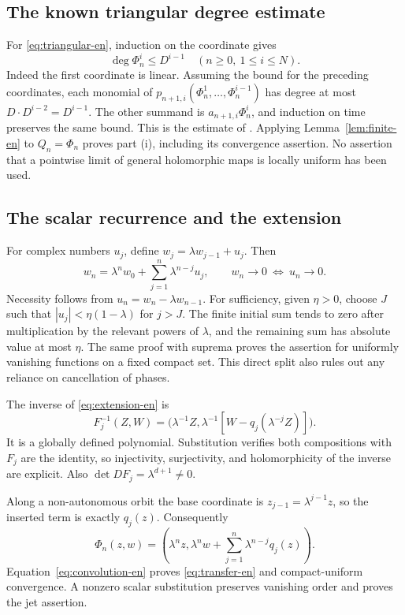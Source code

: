 \documentclass[12pt]{amsart}
\theoremstyle{definition}
\theoremstyle{remark}
\numberwithin{equation}{section}
\begin{document}
\subsection{The known triangular degree estimate}
For \eqref{eq:triangular-en}, induction on the coordinate gives
\begin{equation}\label{eq:degree-en}
\deg\Phi_n^i\leq D^{i-1}\quad(n\geq0,\ 1\leq i\leq N).
\end{equation}
Indeed the first coordinate is linear. Assuming the bound for the preceding coordinates, each monomial of $p_{n+1,i}(\Phi_n^1,\ldots,\Phi_n^{i-1})$ has degree at most $D\cdot D^{i-2}=D^{i-1}$. The other summand is $a_{n+1,i}\Phi_n^i$, and induction on time preserves the same bound. This is the estimate of \cite[Lemma 1]{AS-en}. Applying Lemma~\ref{lem:finite-en} to $Q_n=\Phi_n$ proves part (i), including its convergence assertion. No assertion that a pointwise limit of general holomorphic maps is locally uniform has been used.

\subsection{The scalar recurrence and the extension}
For complex numbers $u_j$, define $w_j=\lambda w_{j-1}+u_j$. Then
\begin{equation}\label{eq:convolution-en}
w_n=\lambda^nw_0+\sum_{j=1}^n\lambda^{n-j}u_j,
\qquad
w_n\to0\ \Longleftrightarrow\ u_n\to0.
\end{equation}
Necessity follows from $u_n=w_n-\lambda w_{n-1}$. For sufficiency, given $\eta>0$, choose $J$ such that $|u_j|<\eta(1-\lambda)$ for $j>J$. The finite initial sum tends to zero after multiplication by the relevant powers of $\lambda$, and the remaining sum has absolute value at most $\eta$. The same proof with suprema proves the assertion for uniformly vanishing functions on a fixed compact set. This direct split also rules out any reliance on cancellation of phases.

The inverse of \eqref{eq:extension-en} is
\begin{equation}\label{eq:inverse-en}
F_j^{-1}(Z,W)=\bigl(\lambda^{-1}Z,
\lambda^{-1}[W-q_j(\lambda^{-j}Z)]\bigr).
\end{equation}
It is a globally defined polynomial. Substitution verifies both compositions with $F_j$ are the identity, so injectivity, surjectivity, and holomorphicity of the inverse are explicit. Also $\det DF_j=\lambda^{d+1}\ne0$.

Along a non-autonomous orbit the base coordinate is $z_{j-1}=\lambda^{j-1}z$, so the inserted term is exactly $q_j(z)$. Consequently
\begin{equation}\label{eq:explicit-orbit-en}
\Phi_n(z,w)=\left(\lambda^nz,
\lambda^nw+\sum_{j=1}^n\lambda^{n-j}q_j(z)\right).
\end{equation}
Equation~\eqref{eq:convolution-en} proves \eqref{eq:transfer-en} and compact-uniform convergence. A nonzero scalar substitution preserves vanishing order and proves the jet assertion.
\end{document}
